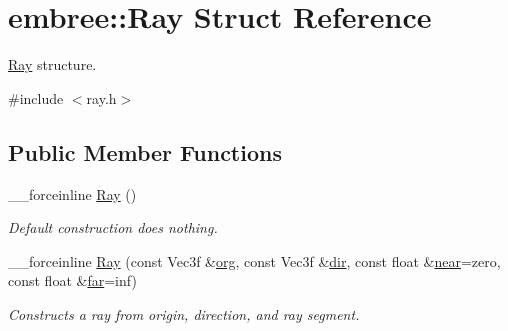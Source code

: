 \hypertarget{structembree_1_1_ray}{
\section{embree::Ray Struct Reference}
\label{structembree_1_1_ray}
}


\hyperlink{structembree_1_1_ray}{Ray} structure.  




{\ttfamily \#include $<$ray.h$>$}

\subsection*{Public Member Functions}
\begin{DoxyCompactItemize}
\item 
\_\-\_\-forceinline \hyperlink{structembree_1_1_ray_a223693cb6d884edd6fc76086afaa7ac3}{Ray} ()
\begin{DoxyCompactList}\small\item\em Default construction does nothing. \item\end{DoxyCompactList}\item 
\_\-\_\-forceinline \hyperlink{structembree_1_1_ray_a032f315b90ca77866d255238418ba256}{Ray} (const Vec3f \&\hyperlink{structembree_1_1_ray_a0a9e1d8cf6c42453d0fa5c3b410526dc}{org}, const Vec3f \&\hyperlink{structembree_1_1_ray_a1293d54db01207411c5068245e5c9d4e}{dir}, const float \&\hyperlink{structembree_1_1_ray_acbf0f6c2fd6cca9aa909a4085ab6352b}{near}=zero, const float \&\hyperlink{structembree_1_1_ray_adeae2ec1595d757f20713d6e4a365f1d}{far}=inf)
\begin{DoxyCompactList}\small\item\em Constructs a ray from origin, direction, and ray segment. \item\end{DoxyCompactList}\end{DoxyCompactItemize}
